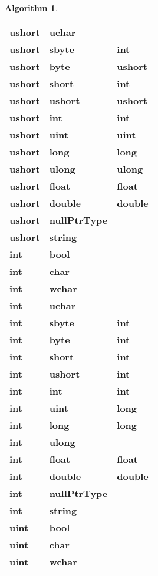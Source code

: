 \documentclass[a4paper,oneside,11pt]{book}
\theoremstyle{definition}
\newtheorem{algo}{Algorithm}[section]
\begin{document}
\begin{algo}
\begin{flushleft}
\begin{supertabular}{lll}
\textbf{ushort}& \textbf{uchar}& \\
\textbf{ushort}& \textbf{sbyte}& \textbf{int}\\
\textbf{ushort}& \textbf{byte}& \textbf{ushort}\\
\textbf{ushort}& \textbf{short}& \textbf{int}\\
\textbf{ushort}& \textbf{ushort}& \textbf{ushort}\\
\textbf{ushort}& \textbf{int}& \textbf{int}\\
\textbf{ushort}& \textbf{uint}& \textbf{uint}\\
\textbf{ushort}& \textbf{long}& \textbf{long}\\
\textbf{ushort}& \textbf{ulong}& \textbf{ulong}\\
\textbf{ushort}& \textbf{float}& \textbf{float}\\
\textbf{ushort}& \textbf{double}& \textbf{double}\\
\textbf{ushort}& \textbf{nullPtrType}& \\
\textbf{ushort}& \textbf{string}& \\
\hline
\textbf{int}& \textbf{bool}& \\
\textbf{int}& \textbf{char}& \\
\textbf{int}& \textbf{wchar}& \\
\textbf{int}& \textbf{uchar}& \\
\textbf{int}& \textbf{sbyte}& \textbf{int}\\
\textbf{int}& \textbf{byte}& \textbf{int}\\
\textbf{int}& \textbf{short}& \textbf{int}\\
\textbf{int}& \textbf{ushort}& \textbf{int}\\
\textbf{int}& \textbf{int}& \textbf{int}\\
\textbf{int}& \textbf{uint}& \textbf{long}\\
\textbf{int}& \textbf{long}& \textbf{long}\\
\textbf{int}& \textbf{ulong}& \\
\textbf{int}& \textbf{float}& \textbf{float}\\
\textbf{int}& \textbf{double}& \textbf{double}\\
\textbf{int}& \textbf{nullPtrType}& \\
\textbf{int}& \textbf{string}& \\
\hline
\textbf{uint}& \textbf{bool}& \\
\textbf{uint}& \textbf{char}& \\
\textbf{uint}& \textbf{wchar}& \\

\end{supertabular}
\end{flushleft}
\end{algo}
\end{document}
